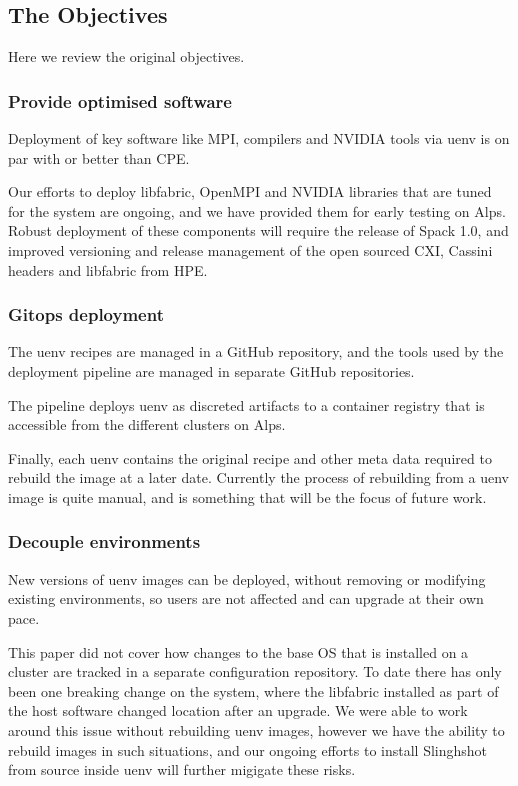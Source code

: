 \subsection{The Objectives}
Here we review the original objectives.

\subsubsection{Provide optimised software}

Deployment of key software like MPI, compilers and NVIDIA tools via uenv is on par with or better than CPE.

Our efforts to deploy libfabric, OpenMPI and NVIDIA libraries that are tuned for the system are ongoing, and we have provided them for early testing on Alps.
Robust deployment of these components will require the release of Spack 1.0, and improved versioning and release management of the open sourced CXI, Cassini headers and libfabric from HPE.

\subsubsection{Gitops deployment}

The uenv recipes are managed in a GitHub repository, and the tools used by the deployment pipeline are managed in separate GitHub repositories.

The pipeline deploys uenv as discreted artifacts to a container registry that is accessible from the different clusters on Alps.

Finally, each uenv contains the original recipe and other meta data required to rebuild the image at a later date.
Currently the process of rebuilding from a uenv image is quite manual, and is something that will be the focus of future work.

\subsubsection{Decouple environments}

New versions of uenv images can be deployed, without removing or modifying existing environments, so users are not affected and can upgrade at their own pace.

This paper did not cover how changes to the base OS that is installed on a cluster are tracked in a separate configuration repository.
To date there has only been one breaking change on the system, where the libfabric installed as part of the \slingshot host software changed location after an upgrade.
We were able to work around this issue without rebuilding uenv images, however we have the ability to rebuild images in such situations, and our ongoing efforts to install Slinghshot from source inside uenv will further migigate these risks.

